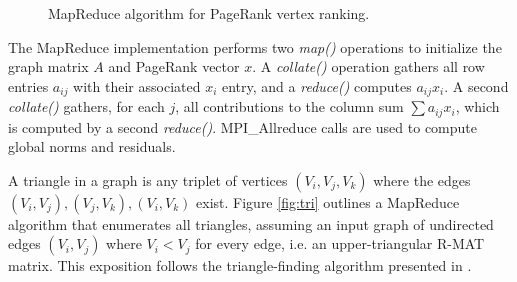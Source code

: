 \begin{figure}[htb]
 \begin{center}\end{center}

 \caption{MapReduce algorithm for PageRank vertex ranking.}

 \label{fig:pr}
\end{figure}

The MapReduce implementation performs two {\it map()} operations to
initialize the graph matrix $A$ and PageRank vector $x$.  A {\it
collate()} operation gathers all row entries $a_{ij}$ with their
associated $x_i$ entry, and a {\it reduce()} computes $a_{ij} x_i$.  A
second {\it collate()} gathers, for each $j$, all contributions to the
column sum $\sum a_{ij} x_i$, which is computed by a second {\it
reduce()}.  MPI\_Allreduce calls are used to compute global norms and
residuals.

A triangle in a graph is any triplet of vertices $(V_i,V_j,V_k)$ where
the edges $(V_i,V_j), (V_j,V_k), (V_i,V_k)$ exist.  Figure
\ref{fig:tri} outlines a MapReduce algorithm that enumerates all
triangles, assuming an input graph of undirected edges $(V_i,V_j)$
where $V_i < V_j$ for every edge, i.e. an upper-triangular R-MAT
matrix.  This exposition follows the triangle-finding algorithm
presented in \cite{Cohen}.

